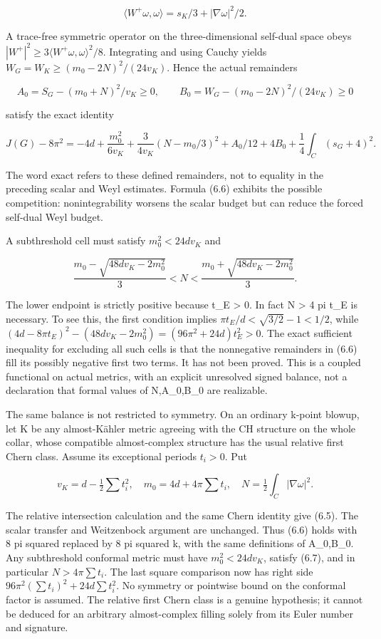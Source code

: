 \documentclass[
  10pt,
]{article}
\begin{document}
\[
 \langle W^+\omega,\omega\rangle=s_K/3+|\nabla\omega|^2/2.
\]

A trace-free symmetric operator on the three-dimensional self-dual space
obeys \(|W^+|^2\ge3\langle W^+\omega,\omega\rangle^2/8\). Integrating
and using Cauchy yields \(W_G=W_K\ge(m_0-2N)^2/(24v_K)\). Hence the
actual remainders

\[
 A_0=S_G-(m_0+N)^2/v_K\ge0,\qquad
 B_0=W_G-(m_0-2N)^2/(24v_K)\ge0
\]

satisfy the exact identity

\[
 \boxed{J(G)-8\pi^2
 =-4d+\frac{m_0^2}{6v_K}
    +\frac{3}{4v_K}(N-m_0/3)^2
    +A_0/12+4B_0+\frac14\int_C(s_G+4)^2.}                \tag{6.6}
\]

The word exact refers to these defined remainders, not to equality in
the preceding scalar and Weyl estimates. Formula (6.6) exhibits the
possible competition: nonintegrability worsens the scalar budget but can
reduce the forced self-dual Weyl budget.

A subthreshold cell must satisfy \(m_0^2<24dv_K\) and

\[
 \frac{m_0-\sqrt{48dv_K-2m_0^2}}3<N<
 \frac{m_0+\sqrt{48dv_K-2m_0^2}}3.                        \tag{6.7}
\]

The lower endpoint is strictly positive because t\_E \textgreater{} 0.
In fact N \textgreater{} 4 pi t\_E is necessary. To see this, the first
condition implies \(\pi t_E/d<\sqrt{3/2}-1<1/2\), while
\((4d-8\pi t_E)^2-(48dv_K-2m_0^2)=(96\pi^2+24d)t_E^2>0\). The exact
sufficient inequality for excluding all such cells is that the
nonnegative remainders in (6.6) fill its possibly negative first two
terms. It has not been proved. This is a coupled functional on actual
metrics, with an explicit unresolved signed balance, not a declaration
that formal values of N,A\_0,B\_0 are realizable.

The same balance is not restricted to symmetry. On an ordinary k-point
blowup, let K be any almost-Kähler metric agreeing with the CH structure
on the whole collar, whose compatible almost-complex structure has the
usual relative first Chern class. Assume its exceptional periods
\(t_i>0\). Put

\[
 v_K=d-\tfrac12\sum t_i^2,\quad m_0=4d+4\pi\sum t_i,
                   \quad N=\tfrac12\int_C|\nabla\omega|^2.
\]

The relative intersection calculation and the same Chern identity give
(6.5). The scalar transfer and Weitzenbock argument are unchanged. Thus
(6.6) holds with 8 pi squared replaced by 8 pi squared k, with the same
definitions of A\_0,B\_0. Any subthreshold conformal metric must have
\(m_0^2<24dv_K\), satisfy (6.7), and in particular \(N>4\pi\sum t_i\).
The last square comparison now has right side
\(96\pi^2(\sum t_i)^2+24d\sum t_i^2\). No symmetry or pointwise bound on
the conformal factor is assumed. The relative first Chern class is a
genuine hypothesis; it cannot be deduced for an arbitrary almost-complex
filling solely from its Euler number and signature.
\end{document}
